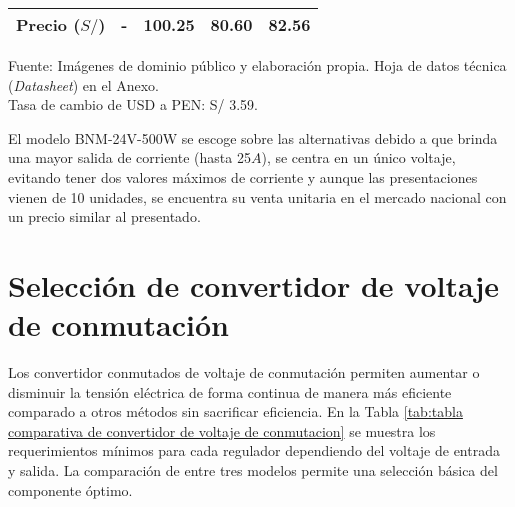 \begin{savenotes}
\begin{mytable}[H]
\begin{tabular}{l|c|c|c|c|}
			\multicolumn{1}{|l|}{
				\begin{minipage}{\myforthmaxsizeofcontenttable}	
					\textbf{Precio ($S/$)}
				\end{minipage}
			} & - & 100.25 & 80.60 & 82.56 \\ \hline
		\end{tabular}
		\begin{myflushcenteraftertable}	
			Fuente: Imágenes de dominio público y elaboración propia. Hoja de datos técnica (\textit{Datasheet}) en el Anexo.\\
			Tasa de cambio de USD a PEN: S/ 3.59.
		\end{myflushcenteraftertable}
	\end{mytable}
\end{savenotes}

El modelo BNM-24V-500W se escoge sobre las alternativas debido a que brinda una mayor salida de corriente (hasta 25$A$), se centra en un único voltaje, evitando tener dos valores máximos de corriente y aunque las presentaciones vienen de 10 unidades, se encuentra su venta unitaria en el mercado nacional con un precio similar al presentado.

\section{Selección de convertidor de voltaje de conmutación}

Los convertidor conmutados de voltaje de conmutación permiten aumentar o disminuir la tensión eléctrica de forma continua de manera más eficiente comparado a otros métodos sin sacrificar eficiencia. En la Tabla \ref{tab:tabla comparativa de convertidor de voltaje de conmutacion} se muestra los requerimientos mínimos para cada regulador dependiendo del voltaje de entrada y salida. La comparación de entre tres modelos permite una selección básica del componente óptimo.






